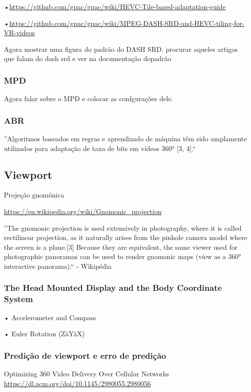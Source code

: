 •\url{https://github.com/gpac/gpac/wiki/HEVC-Tile-based-adaptation-guide}

•\url{https://github.com/gpac/gpac/wiki/MPEG-DASH-SRD-and-HEVC-tiling-for-VR-videos}


Agora mostrar uma figura do padrão do DASH SRD. procurar aqueles artigos que falam do dash srd e ver na documentação dopadrão

\subsubsection{MPD}

Agora falar sobre o MPD e colocar as confgurações dele.

\subsubsection{ABR}

''Algoritmos baseados em regras e aprendizado de máquina têm sido amplamente utilizados para adaptação de taxa de bits em vídeos 360° [3, 4].``

\subsection{Viewport}

Projeção gnomônica

\url{https://en.wikipedia.org/wiki/Gnomonic_projection}

''The gnomonic projection is used extensively in photography, where it is called rectilinear projection, as it naturally arises from the pinhole camera model where the screen is a plane.[3] Because they are equivalent, the same viewer used for photographic panoramas can be used to render gnomonic maps (view as a 360° interactive panorama).`` - Wikipédia

\subsubsection{The Head Mounted Display and the Body Coordinate System}

•	Accelerometer and Compass

•	Euler Rotation (ZàYàX)

\subsubsection{Predição de viewport e erro de predição}

Optimizing 360 Video Delivery Over Cellular Networks
\url{https://dl.acm.org/doi/10.1145/2980055.2980056}

